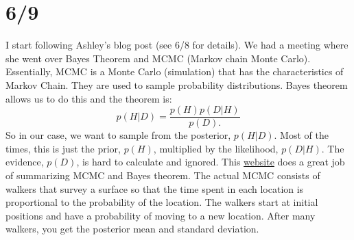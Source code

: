 \documentclass[12pt]{article}
\begin{document}
\section{6/9}
I start following Ashley's blog post (see 6/8 for details). We had a meeting where she went over Bayes Theorem and MCMC (Markov chain Monte Carlo). Essentially, MCMC is a Monte Carlo (simulation) that has the characteristics of Markov Chain. They are used to sample probability distributions. Bayes theorem allows us to do this and the theorem is: 
\begin{equation}
        p(H|D) = \frac{p(H)p(D|H)}{p(D).} 
\end{equation}
So in our case, we want to sample from the posterior, $p(H|D)$. Most of the times, this is just the prior, $p(H)$, multiplied by the likelihood, $p(D|H)$. The evidence, $p(D)$, is hard to calculate and ignored. This \href{https://towardsdatascience.com/mcmc-intuition-for-everyone-5ae79fff22b1}{website} does a great job of summarizing MCMC and Bayes theorem. The actual MCMC consists of walkers that survey a surface so that the time spent in each location is proportional to the probability of the location. The walkers start at initial positions and have a probability of moving to a new location. After many walkers, you get the posterior mean and standard deviation. 
\end{document}
